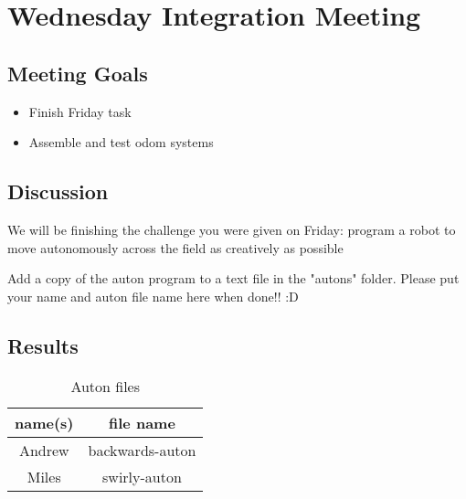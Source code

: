 \section{Wednesday Integration Meeting}

\subsection{Meeting Goals}
\begin{itemize}
    \item Finish Friday task
    \item Assemble and test odom systems
\end{itemize}

\subsection{Discussion}
We will be finishing the challenge you were given on Friday:
program a robot to move autonomously across the field as creatively as possible

Add a copy of the auton program to a text file in the "autons" folder.
Please put your name and auton file name here when done!! :D


\subsection{Results}
\begin{table}
    \centering
    \begin{tabular}{|c|c|}
        \hline
        name(s) & file name \\
        \hline
        Andrew & backwards-auton \\
        Miles & swirly-auton \\
        \hline
    \end{tabular}
    \caption{Auton files}
    \label{tab:auton_files}
\end{table}